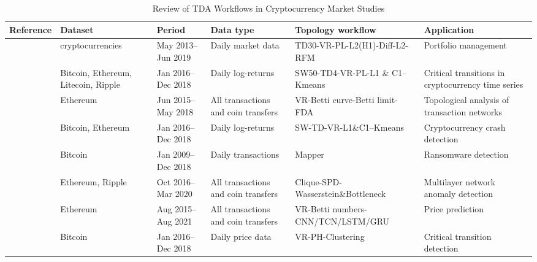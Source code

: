 \documentclass[11pt,reqno]{amsart}
\numberwithin{equation}{section} %
\begin{document}
\begin{landscape}
\begin{table}[htbp]
\centering
\caption{Review of TDA Workflows in Cryptocurrency Market Studies}
\label{tab1}
\setlength{\tabcolsep}{4pt}
\small
\begin{tabular}{
  >{\raggedright\arraybackslash}p{3cm}
  >{\raggedright\arraybackslash}p{3.2cm}
  >{\raggedright\arraybackslash}p{3cm}
  >{\raggedright\arraybackslash}p{3cm}
  >{\raggedright\arraybackslash}p{4.5cm}
  >{\raggedright\arraybackslash}p{4.6cm}}
\toprule
\textbf{Reference} & \textbf{Dataset} & \textbf{Period} 
& \textbf{Data type} & \textbf{Topology workflow} 
& \textbf{Application}\\
\midrule

\citet{rivera2019topological} &
1561 cryptocurrencies &
May 2013--Jun 2019 &
Daily market data &
TD30-VR-PL-L2(H1)-Diff-L2-RFM &
Portfolio management\\

\citet{gidea2020topological} &
Bitcoin, Ethereum, Litecoin, Ripple &
Jan 2016--Dec 2018 &
Daily log-returns &
SW50-TD4-VR-PL-L1 \& C1--Kmeans &
Critical transitions in cryptocurrency time series\\

\citet{li2020dissecting} &
Ethereum &
Jun 2015--May 2018 &
All transactions and coin transfers &
VR-Betti curve-Betti limit-FDA &
Topological analysis of transaction networks\\

\citet{saengduean2020topological} &
Bitcoin, Ethereum &
Jan 2016--Dec 2018 &
Daily log-returns &
SW-TD-VR-L1\&C1--Kmeans &
Cryptocurrency crash detection\\

\citet{akcora2019bitcoinheist} &
Bitcoin &
Jan 2009--Dec 2018 &
Daily transactions &
Mapper &
Ransomware detection\\

\citet{ofori2021topological} &
Ethereum, Ripple &
Oct 2016--Mar 2020 &
All transactions and coin transfers &
Clique-SPD-Wasserstein\&Bottleneck &
Multilayer network anomaly detection\\

\citet{hafez2022ethereum} &
Ethereum &
Aug 2015--Aug 2021 &
All transactions and coin transfers &
VR-Betti numbers-CNN/TCN/LSTM/GRU &
Price prediction\\

\citet{bansal2023identifying} &
Bitcoin &
Jan 2016--Dec 2018 &
Daily price data &
VR-PH-Clustering &
Critical transition detection\\


\end{tabular}
\end{table}
\end{landscape}
\end{document}
